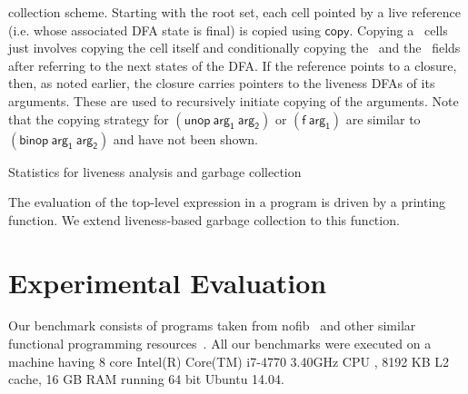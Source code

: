 \documentclass[preprint, 9pt]{sigplanconf}
\begin{document}
collection scheme.  Starting with the root set, each cell pointed by a
live reference  (i.e. whose associated  DFA state is final)  is copied
using $\mathsf{copy}$.   Copying a \CONS\ cells  just involves copying
the  cell  itself   and  conditionally  copying  the   \CAR\  and  the
\CDR\ fields after referring to the  next states of the DFA.  If
the reference points to a closure, then, as noted earlier, the closure
carries pointers  to the liveness  DFAs of its  arguments.  These
are  used to recursively  initiate copying of  the arguments.
Note that  the copying  strategy for  $\mathsf{(unop~arg_1~arg_2)}$ or
$\mathsf{(f~arg_1)}$ are similar to $\mathsf{(binop~arg_1~arg_2)}$ and
have not been shown.



\begin{table*}[t!]
\caption{Statistics for liveness analysis and garbage collection}
\label{tab:exp-results}
\centering


\vskip -5mm
\end{table*} 





The evaluation of  the top-level expression in a program  is driven by
a printing function.  
We extend liveness-based  garbage  collection  to
this function.

\section{Experimental Evaluation}
\label{sec:experiments}
  Our benchmark consists of programs taken from nofib~\cite{nofib} and
  other  similar  functional  programming  resources~\cite{PLT-Scheme,
    gc_bench, huffman-sicp}.   All our  benchmarks were executed  on a
  machine having 8  core Intel(R) Core(TM) i7-4770 3.40GHz  CPU , 8192
  KB L2 cache, 16 GB RAM running 64 bit Ubuntu 14.04.
\end{document}
